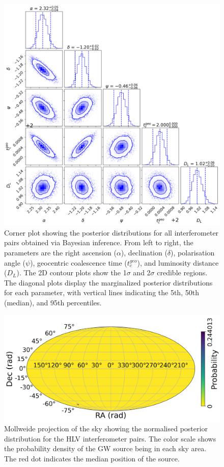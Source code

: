 \documentclass[11pt,a4paper]{article}
\begin{document}
\begin{figure}
    \includegraphics[width=\columnwidth, keepaspectratio]{../figures/corner_HLV.png}
    \caption{Corner plot showing the posterior distributions for all interferometer pairs obtained via Bayesian inference. From left to right, the parameters are the right ascension ($\alpha$), declination ($\delta$), polarisation angle ($\psi$), geocentric coalescence time ($t_c^{geo}$), and luminosity distance ($D_L$). The 2D contour plots show the 1$\sigma$ and 2$\sigma$ credible regions. The diagonal plots display the marginalized posterior distributions for each parameter, with vertical lines indicating the 5th, 50th (median), and 95th percentiles.}
    \label{fig:posterior_hlv}
\end{figure}

\begin{figure}
    \includegraphics[width=\columnwidth, keepaspectratio]{../figures/posterior_map_HLV.png}
    \caption{Mollweide projection of the sky showing the normalised posterior distribution for the HLV interferometer pairs. The color scale shows the probability density of the GW source being in each sky area. The red dot indicates the median position of the source.}
    \label{fig:sky_hlv}
\end{figure}
\end{document}
